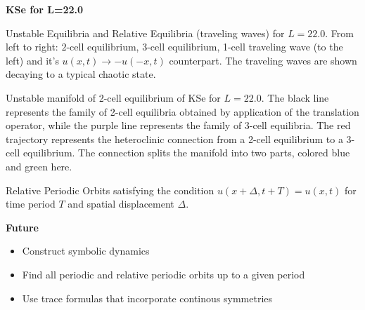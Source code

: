 \documentclass{article}
\begin{document}
\newpage

\LARGE{\color{NavyBlue}\LARGE\bf KSe for L=22.0}

\newpage

\begin{minipage}[t]{5in}
Unstable Equilibria and Relative Equilibria (traveling waves) for $L=22.0$. 
From left to right: $2$-cell equilibrium, $3$-cell equilibrium, 1-cell traveling
wave (to the left) and it's $u(x,t)\rightarrow -u(-x,t)$ counterpart. The traveling
waves are shown decaying to a typical chaotic state.
\end{minipage}

\newpage

\begin{minipage}[t]{5in}
Unstable manifold of 2-cell equilibrium of KSe
for $L=22.0$. The black line represents the family of 2-cell
equilibria obtained by application of the translation operator, 
while the purple line represents the family of 3-cell equilibria.
The red trajectory represents the heteroclinic connection from a 2-cell equilibrium 
to a 3-cell equilibrium. The connection splits the manifold into two parts, 
colored blue and green here.
\end{minipage}

\newpage

\begin{minipage}[t]{5in}
Relative Periodic Orbits satisfying the condition $u(x+\Delta,t+T)=u(x,t)$ for time period $T$ 
and spatial displacement $\Delta$. %
\end{minipage}

\newpage

{\color{NavyBlue}\LARGE\bf  Future }

\newpage

\begin{minipage}[t]{7in}
 \begin{itemize}
  \item Construct symbolic dynamics
  \item Find all periodic and relative periodic orbits up to a given period
  \item Use trace formulas that incorporate continous symmetries
 \end{itemize}
\end{minipage}

\newpage
\newpage

\begin{minipage}[t]{7in}
\normalsize

\end{minipage}
\end{document}
